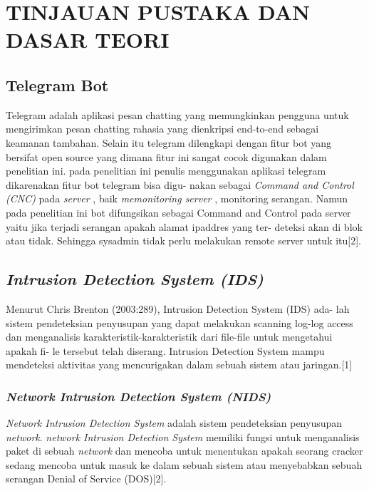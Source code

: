 
\chapter{TINJAUAN PUSTAKA DAN DASAR TEORI}                

\section{Telegram Bot}
Telegram adalah aplikasi pesan chatting yang memungkinkan pengguna untuk
mengirimkan pesan chatting rahasia yang dienkripsi end-to-end sebagai keamanan
tambahan. Selain itu telegram dilengkapi dengan fitur bot yang bersifat open source
yang dimana fitur ini sangat cocok digunakan dalam penelitian ini. pada penelitian
ini penulis menggunakan aplikasi telegram dikarenakan fitur bot telegram bisa digu-
nakan sebagai \emph{Command and Control (CNC)} pada \emph{server} , baik \emph{memonitoring server}
, monitoring serangan. Namun pada penelitian ini bot difungsikan sebagai Command
and Control pada server yaitu jika terjadi serangan apakah alamat ipaddres yang ter-
deteksi akan di blok atau tidak. Sehingga sysadmin tidak perlu melakukan remote
server untuk itu[2].

\section {\emph{Intrusion Detection System (IDS)}}
Menurut Chris Brenton (2003:289), Intrusion Detection System (IDS) ada-
lah sistem pendeteksian penyusupan yang dapat melakukan scanning log-log access
dan menganalisis karakteristik-karakteristik dari file-file untuk mengetahui apakah fi-
le tersebut telah diserang. Intrusion Detection System mampu mendeteksi aktivitas
yang mencurigakan dalam sebuah sistem atau jaringan.[1]

\indent
\subsection {\emph {Network Intrusion Detection System (\emph{NIDS})}}
\emph{Network Intrusion Detection System} adalah sistem pendeteksian penyusupan
\emph{network}. \emph{network Intrusion Detection System} memiliki fungsi untuk menganalisis
paket di sebuah \emph{network} dan mencoba untuk menentukan apakah seorang cracker
sedang mencoba untuk masuk ke dalam sebuah sistem atau menyebabkan sebuah
serangan Denial of Service (DOS)[2].

